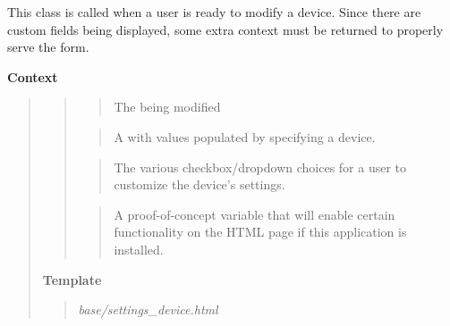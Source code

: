 \documentclass[letterpaper,10pt,english]{sphinxmanual}
\begin{document}

\begin{fulllineitems}
\label{modules/webapp:webapp.views.settings_change_device}
This class is called when a user is ready to modify a device.
Since there are custom fields being displayed, some extra context
must be returned to properly serve the form.

\textbf{Context}
\begin{quote}
\begin{quote}

\begin{quote}

The {\hyperref[modules/microdata:microdata.models.Device]{\emph{}}} being modified
\end{quote}

\begin{quote}

A {\hyperref[modules/webapp:webapp.views.SettingsForm]{\emph{}}} with values populated
by specifying a device.
\end{quote}

  
\begin{quote}

The various checkbox/dropdown choices for a user to customize
the device's settings.
\end{quote}

\begin{quote}

A proof-of-concept variable that will enable certain
functionality on the HTML page if this application is installed.
\end{quote}
\end{quote}

\textbf{Template}
\begin{quote}

\emph{base/settings\_device.html}
\end{quote}
\end{quote}

\end{fulllineitems}

\end{document}
